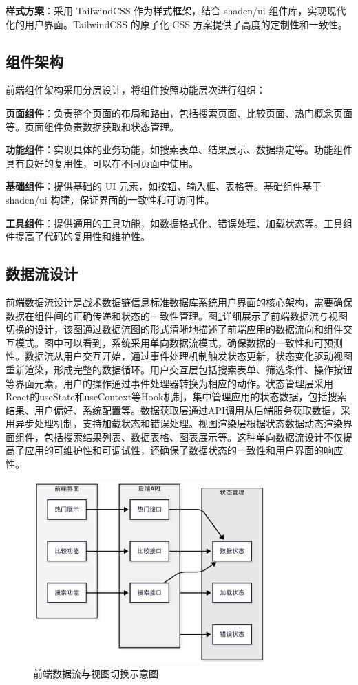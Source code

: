 \textbf{样式方案}：采用 TailwindCSS 作为样式框架，结合 shadcn/ui 组件库，实现现代化的用户界面。TailwindCSS 的原子化 CSS 方案提供了高度的定制性和一致性。

\subsection{组件架构}
前端组件架构采用分层设计，将组件按照功能层次进行组织：

\textbf{页面组件}：负责整个页面的布局和路由，包括搜索页面、比较页面、热门概念页面等。页面组件负责数据获取和状态管理。

\textbf{功能组件}：实现具体的业务功能，如搜索表单、结果展示、数据绑定等。功能组件具有良好的复用性，可以在不同页面中使用。

\textbf{基础组件}：提供基础的 UI 元素，如按钮、输入框、表格等。基础组件基于 shadcn/ui 构建，保证界面的一致性和可访问性。

\textbf{工具组件}：提供通用的工具功能，如数据格式化、错误处理、加载状态等。工具组件提高了代码的复用性和维护性。

\subsection{数据流设计}
前端数据流设计是战术数据链信息标准数据库系统用户界面的核心架构，需要确保数据在组件间的正确传递和状态的一致性管理。图\ref{fig:frontend-dataflow}详细展示了前端数据流与视图切换的设计，该图通过数据流图的形式清晰地描述了前端应用的数据流向和组件交互模式。图中可以看到，系统采用单向数据流模式，确保数据的一致性和可预测性。数据流从用户交互开始，通过事件处理机制触发状态更新，状态变化驱动视图重新渲染，形成完整的数据循环。用户交互层包括搜索表单、筛选条件、操作按钮等界面元素，用户的操作通过事件处理器转换为相应的动作。状态管理层采用React的useState和useContext等Hook机制，集中管理应用的状态数据，包括搜索结果、用户偏好、系统配置等。数据获取层通过API调用从后端服务获取数据，采用异步处理机制，支持加载状态和错误处理。视图渲染层根据状态数据动态渲染界面组件，包括搜索结果列表、数据表格、图表展示等。这种单向数据流设计不仅提高了应用的可维护性和可调试性，还确保了数据状态的一致性和用户界面的响应性。

\begin{figure}[H]
  \centering
  \includegraphics[width=0.8\textwidth]{chapters/fig-0/frontend-dataflow.png}
  \caption{前端数据流与视图切换示意图}
  \label{fig:frontend-dataflow}
\end{figure}

